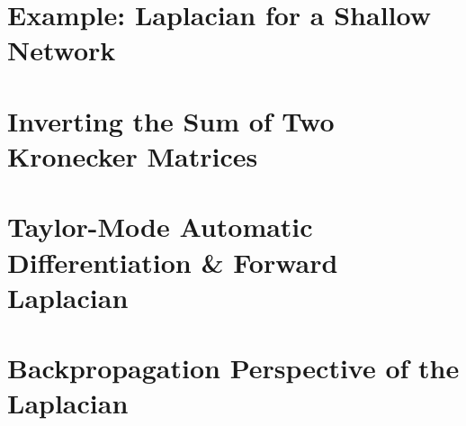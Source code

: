 \section{Example: Laplacian for a Shallow Network}


\section{Inverting the Sum of Two Kronecker Matrices}\label{sec:inverse_kronecker_sum}


\section{Taylor-Mode Automatic Differentiation \& Forward Laplacian}


\section{Backpropagation Perspective of the Laplacian}



